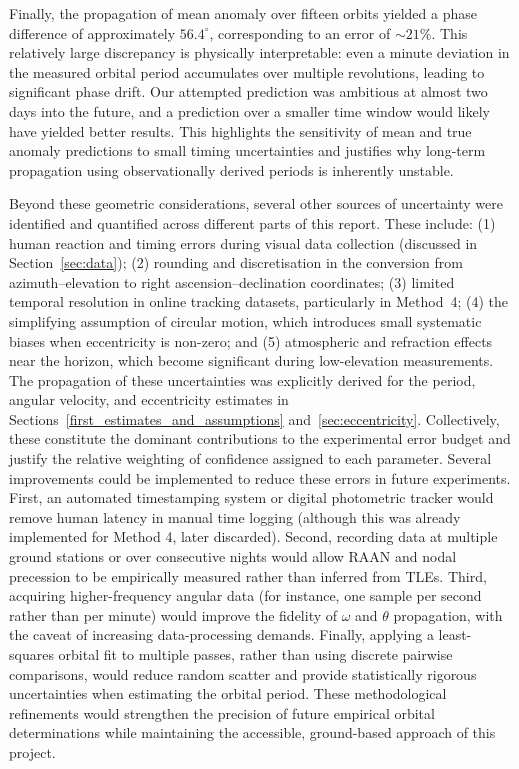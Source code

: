 \documentclass{article}
\begin{document}
Finally, the propagation of mean anomaly over fifteen orbits yielded a phase difference of approximately $56.4^{\circ}$, corresponding to an error of $\sim21\%$. This relatively large discrepancy is physically interpretable: even a minute deviation in the measured orbital period accumulates over multiple revolutions, leading to significant phase drift. Our attempted prediction was ambitious at almost two days into the future, and a prediction over a smaller time window would likely have yielded better results. This highlights the sensitivity of mean and true anomaly predictions to small timing uncertainties and justifies why long-term propagation using observationally derived periods is inherently unstable.

Beyond these geometric considerations, several other sources of uncertainty were identified and quantified across different parts of this report. These include: (1) human reaction and timing errors during visual data collection (discussed in Section~\ref{sec:data}); (2) rounding and discretisation in the conversion from azimuth–elevation to right ascension–declination coordinates; (3) limited temporal resolution in online tracking datasets, particularly in Method~4; (4) the simplifying assumption of circular motion, which introduces small systematic biases when eccentricity is non-zero; and (5) atmospheric and refraction effects near the horizon, which become significant during low-elevation measurements. The propagation of these uncertainties was explicitly derived for the period, angular velocity, and eccentricity estimates in Sections~\ref{first_estimates_and_assumptions} and~\ref{sec:eccentricity}. Collectively, these constitute the dominant contributions to the experimental error budget and justify the relative weighting of confidence assigned to each parameter. Several improvements could be implemented to reduce these errors in future experiments. First, an automated timestamping system or digital photometric tracker would remove human latency in manual time logging (although this was already implemented for Method 4, later discarded). Second, recording data at multiple ground stations or over consecutive nights would allow RAAN and nodal precession to be empirically measured rather than inferred from TLEs. Third, acquiring higher-frequency angular data (for instance, one sample per second rather than per minute) would improve the fidelity of $\omega$ and $\theta$ propagation, with the caveat of increasing data-processing demands. Finally, applying a least-squares orbital fit to multiple passes, rather than using discrete pairwise comparisons, would reduce random scatter and provide statistically rigorous uncertainties when estimating the orbital period. These methodological refinements would strengthen the precision of future empirical orbital determinations while maintaining the accessible, ground-based approach of this project.
\end{document}
